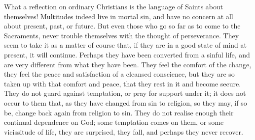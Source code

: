 What a reflection on ordinary Christians is the language of Saints
about themselves! Multitudes indeed live in mortal sin, and have no
concern at all about present, past, or future. But even those who go
so far as to come to the Sacraments, never trouble themselves with the
thought of perseverance. They seem to take it as a matter of course
that, if they are in a good state of mind at present, it will
continue. Perhaps they have been converted from a sinful life, and are
very different from what they have been. They feel the comfort of the
change, they feel the peace and satisfaction of a cleansed conscience,
but they are so taken up with that comfort and peace, that they rest
in it and become secure. They do not guard against temptation, or pray
for support under it; it does not occur to them that, as they have
changed from sin to religion, so they may, if so be, change back again
from religion to sin. They do not realise enough their continual
dependence on God; some temptation comes on them, or some vicissitude
of life, they are surprised, they fall, and perhaps they never
recover.

